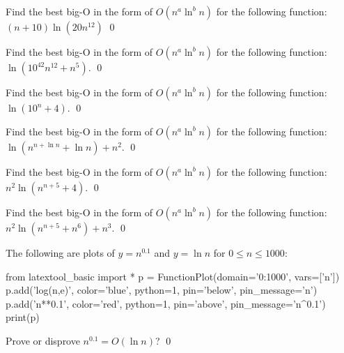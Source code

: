 \begin{ex} 
Find the best big-O in the form of $O(n^a\ln^b n)$ for the following function:
$(n + 10)\ln (20 n^{12})$
\qed
\end{ex}

\begin{ex}
Find the best big-O in the form of $O(n^a\ln^b n)$ for the following function:
$\ln (10^{42} n^{12} + n^5)$. 
\qed
\end{ex}

\begin{ex}
Find the best big-O in the form of $O(n^a\ln^b n)$ for the following function:
$\ln (10^n + 4)$.
\qed
\end{ex}

\begin{ex}
Find the best big-O in the form of $O(n^a\ln^b n)$ for the following function:
$\ln (n^{n + \ln n} + \ln n) + n^2$. 
\qed
\end{ex}

\begin{ex}
Find the best big-O in the form of $O(n^a\ln^b n)$ for the following function:
$n^2 \ln (n^{n + 5} + 4)$. 
\qed
\end{ex}

\begin{ex}
Find the best big-O in the form of $O(n^a\ln^b n)$ for the following function:
$n^2 \ln (n^{n + 5} + n^6) + n^3$. 
\qed
\end{ex}

\begin{ex}
The following are plots of $y = n^{0.1}$ and $y = \ln n$
for $0 \leq n \leq 1000$:
\begin{python}
from latextool_basic import *
p = FunctionPlot(domain='0:1000', vars=['n'])
p.add('log(n,e)', color='blue', python=1, pin='below', pin_message='\ln n')
p.add('n**0.1', color='red', python=1, pin='above', pin_message='n^{0.1}')
print(p)
\end{python}
Prove or disprove $n^{0.1} = O(\ln n)$?
\qed
\end{ex}

